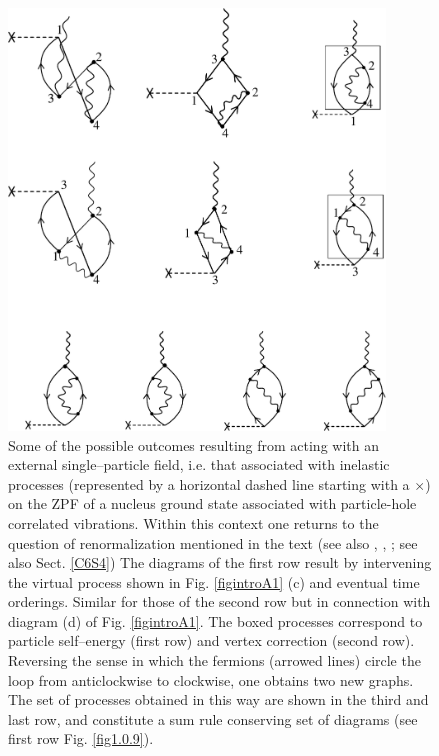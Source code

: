\begin{figure}
\centerline {
\includegraphics*[width=10cm]{introduccion/figs/fig1_7_2}
}
\caption{Some of the possible outcomes resulting from acting with an external single--particle field, i.e. that associated with inelastic processes (represented by a horizontal dashed line starting with a $\times$) on the ZPF of a nucleus ground state associated with particle-hole correlated vibrations. Within this context one returns to the question of  renormalization mentioned in the text (see also \cite{Idini:15}, \cite{Broglia:16}, \cite{Barranco:17}; see also Sect. \ref{C6S4}) The diagrams of the first row result by intervening the virtual process shown in Fig. \ref{figintroA1} (c) and eventual time orderings. Similar for those of the second row but in connection with diagram (d) of Fig. \ref{figintroA1}. The boxed processes correspond to particle self--energy (first row) and vertex correction (second row). Reversing the sense in which the fermions (arrowed lines) circle the loop from anticlockwise to clockwise, one obtains two new graphs. The  set of processes obtained in this way are shown in the third and last row, and constitute a sum rule conserving set of diagrams (see first row Fig. \ref{fig1.0.9}).}
\label{figintroA2}
\end{figure}
\clearpage
